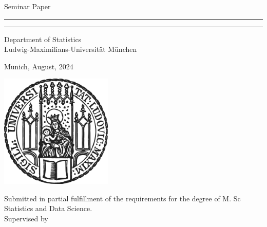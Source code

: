 \begin{titlepage}
\begin{center}
    
\LARGE
Seminar Paper
    
\vspace{0.5cm}
      
\rule{\textwidth}{1.5pt}
\LARGE
\textbf{\mytitle}
\rule{\textwidth}{1.5pt}
   
\vspace{0.5cm}
      
\large
Department of Statistics \\
Ludwig-Maximilians-Universität München 

\vfill

\Large
\textbf{\myname}

\vfill

\large
Munich, August, 2024
      
\vfill

\includegraphics[width = 0.4\textwidth]{sigillum.png}

\vfill

\normalsize
Submitted in partial fulfillment of the requirements for the degree of M. Sc Statistics and Data Science.
\\

Supervised by \mysupervisor

\end{center}
\end{titlepage}


\newpage

